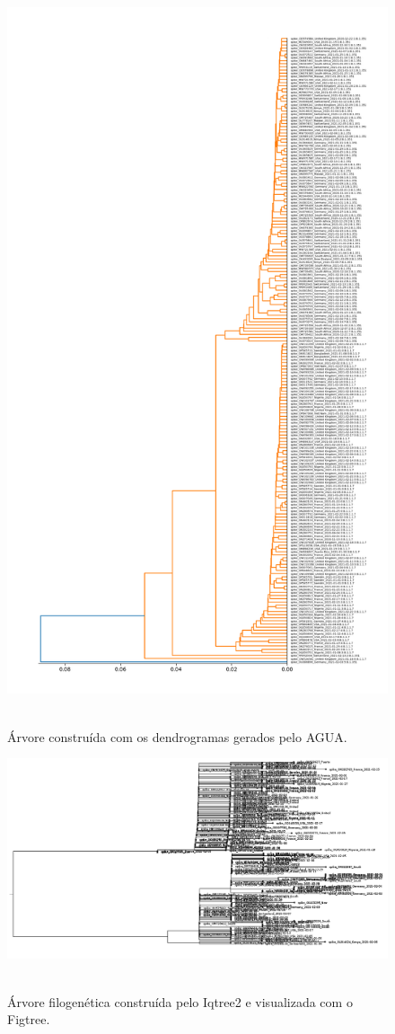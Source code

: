 \label{an:arvore_agua}
\begin{figure}[htb]
  \centering
  \caption{Árvore construída com os dendrogramas gerados pelo AGUA.}
  \includegraphics[scale=0.5]{../resultados/arvores/agua_arvore.png}
  ~\label{fig:arvore_agua}
\end{figure}

\label{an:arvore_iqtree}
\begin{figure}[htb]
  \centering
  \caption{Árvore filogenética construída pelo Iqtree2 e visualizada com o Figtree.}
  \includegraphics[scale=0.4]{../resultados/arvores/iqtree_arvore.png}
  ~\label{fig:arvore_iqtree}
\end{figure}